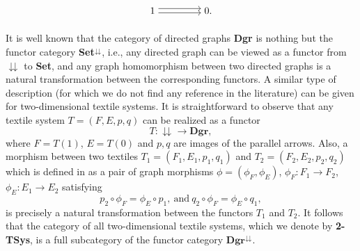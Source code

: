 \documentclass[a4paper,reqno,12pt]{amsart}
\theoremstyle{definition}
\theoremstyle{remark}
\begin{document}
\[
\begin{tikzpicture}[scale=1]
\node[] (A) at (0,0) {$1$};
\node[] (B) at (2,0) {$0$.};

\draw[transform canvas={yshift=0.5ex}, ->] (A) -- (B);
\draw[transform canvas={yshift=-0.5ex}, ->] (A) -- (B);

\end{tikzpicture}
\] 

It is well known that the category of directed graphs \textbf{Dgr} is nothing but the functor category \textbf{Set}$^\downdownarrows$, i.e., any directed graph can be viewed as a functor from $\downdownarrows$ to \textbf{Set}, and any graph homomorphism between two directed graphs is a natural transformation between the corresponding functors. A similar type of description (for which we do not find any reference in the literature) can be given for two-dimensional textile systems. It is straightforward to observe that any textile system $T=(F,E,p,q)$ can be realized as a functor \[T:\downdownarrows\longrightarrow \textbf{Dgr},\] where $F=T(1)$, $E=T(0)$ and $p,q$ are images of the parallel arrows. Also, a morphism between two textiles $T_1=(F_1,E_1,p_1,q_1)$ and $T_2=(F_2,E_2,p_2,q_2)$ which is defined in \cite{KPW} as a pair of graph morphisms $\phi=(\phi_F,\phi_E)$, $\phi_F:F_1\longrightarrow F_2$, $\phi_E: E_1\longrightarrow E_2$ satisfying \[p_2\circ \phi_F=\phi_E \circ p_1,~\text{and}~q_2 \circ \phi_F=\phi_E \circ q_1,\] is precisely a natural transformation between the functors $T_1$ and $T_2$. It follows that the category of all two-dimensional textile systems, which we denote by \textbf{2-TSys}, is a full subcategory of the functor category $\textbf{Dgr}^\downdownarrows$. 
\end{document}
